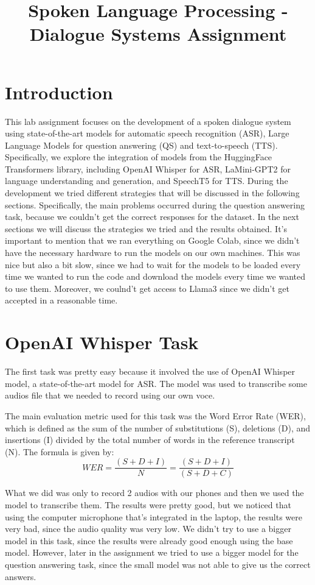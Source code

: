 \documentclass{Interspeech2024}
\title{Spoken Language Processing - Dialogue Systems Assignment}
\begin{document}
\maketitle
  

\section{Introduction}
This lab assignment focuses on the development of a spoken dialogue system using state-of-the-art models for automatic speech recognition (ASR), Large Language Models for question answering (QS) and text-to-speech (TTS). Specifically, we explore the integration of models from the HuggingFace Transformers library, including OpenAI Whisper for ASR, LaMini-GPT2 for language understanding and generation, and SpeechT5 for TTS.
During the development we tried different strategies that will be discussed in the following sections. Specifically, the main problems occurred
during the question answering task, because we couldn't get the 
correct responses for the dataset. In the next sections we will discuss the strategies we tried and the results obtained.
It's important to mention that we ran everything on 
Google Colab, since we didn't have the necessary hardware to run the models on our own machines. 
This was nice but also a bit slow, since we had to wait for the models to be loaded every time we wanted to run the code
and download the models every time we wanted to use them. Moreover,
we coulnd't get access to Llama3 since we didn't get 
accepted in a reasonable time.

\section{OpenAI Whisper Task}

The first task was pretty easy because it involved the use of
OpenAI Whisper model, a state-of-the-art model for ASR. The
model was used to transcribe some audios file that we needed
to record using our own voce.

The main evaluation metric used for this task was the Word Error Rate (WER), which is defined as the sum of the number of substitutions (S), deletions (D), and insertions (I) divided by the total number of words in the reference transcript (N). The formula is given by:
\[
WER = \frac{{(S + D + I)}}{N} = \frac{{(S + D + I)}}{{(S + D + C)}}
\]

What we did was only to record 2 audios with our phones 
and then we used the model to transcribe them. The results
were pretty good, but we noticed that using the computer 
microphone that's integrated in the laptop, the results were
very bad, since the audio quality was very low.
We didn't try to use a bigger model in this task, since the
results were already good enough using the base model. However,
later in the assignment we tried to use a bigger model for the
question answering task, since the small model was not able
to give us the correct answers.
\end{document}
